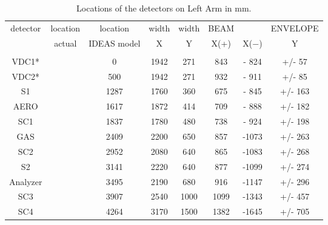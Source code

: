 \begin{table}[hptb]
\begin{center}
\begin{tabular}{cccccccc}
detector&location&  location& width &   width &      BEAM  &        & ENVELOPE \\
        & actual &IDEAS model&   X  &     Y   &      X(+)&  X($-$) &   Y\\  \hline
       &        &          &        &         &          &         &           \\  \hline    
VDC1*  &        &         0&    1942&     271 &     843  &  - 824  &  +/-  57  \\    
VDC2*  &        &       500&    1942&     271 &     932  &  - 911  &  +/-  85  \\ 
S1     &        &      1287&    1760&     360 &     675  &  - 845  &  +/- 163  \\    
AERO   &        &      1617&    1872&     414 &     709  &  - 888  &  +/- 182  \\   
SC1    &        &      1837&    1780&     480 &     738  &  - 924  &  +/- 198  \\    
GAS    &        &      2409&    2200&     650 &     857  &  -1073  &  +/- 263  \\    
SC2    &        &      2952&    2080&     640 &     865  &  -1083  &  +/- 268  \\   
S2     &        &      3141&    2220&     640 &     877  &  -1099  &  +/- 274  \\   
Analyzer&       &      3495&    2190&     680 &     916  &  -1147  &  +/- 296  \\   
SC3    &        &      3907&    2540&    1000 &    1099  &  -1343  &  +/- 457  \\  
SC4    &        &      4264&    3170&    1500 &    1382  &  -1645  &  +/- 705  \\    
\end{tabular}
\end{center}
\caption[Detectors: Left Arm Detector Locations]{Locations of
 the detectors on Left Arm in mm.}
\label{ta:Ldetg}
\end{table}



%
%
%
%
